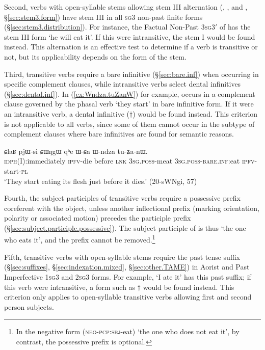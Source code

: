 Second, verbs with open-syllable stems allowing stem III alternation (, ,  and , §\ref{sec:stem3.form}) have stem III in all \textsc{sg}\fl{}3 non-past finite forms  (§\ref{sec:stem3.distribution}). For instance, the Factual Non-Past 3\textsc{sg}\fl{}3$'$ of  has the stem III form  `he will eat it'. If this were intransitive, the stem I  would be found instead. This alternation is an effective test to determine if a verb is transitive or not, but its applicability depends on the form of the stem.

Third, transitive verbs require a bare infinitive (§\ref{sec:bare.inf}) when occurring in specific complement clauses, while intransitive verbs select dental infinitives (§\ref{sec:dental.inf}). In (\ref{ex:Wndza.tuZanW}) for example,  occurs in a complement clause governed by the phasal verb  `they start' in bare infinitive form. If it were an intransitive verb, a dental infinitive ($\dagger$) would be found instead. This criterion is not applicable to all verbs, since some of them cannot occur in the subtype of complement clauses where bare infinitives are found for semantic reasons.

\begin{exe}
\ex   \label{ex:Wndza.tuZanW}
\gll  ɕlaʁ pjɯ-si ɕɯŋgɯ qʰe ɯ-ɕa ɯ-ndza tu-ʑa-nɯ. \\
\textsc{idph}(I):immediately \textsc{ipfv}-die before \textsc{lnk} \textsc{3sg}.\textsc{poss}-meat \textsc{3sg}.\textsc{poss}-\textsc{bare}.\textsc{inf}:eat \textsc{ipfv}-start-\textsc{pl} \\
\glt `They start eating its flesh just before it dies.' (20-sWNgi, 57)
\end{exe}

Fourth, the subject participles of transitive verbs require a possessive prefix coreferent with the object, unless another inflectional prefix (marking orientation, polarity or associated motion) precedes the participle prefix   (§\ref{sec:subject.participle.possessive}). The subject participle of  is thus  `the one who eats it', and the prefix  cannot be removed.\footnote{In the negative form  (\textsc{neg}-\textsc{pcp}:\textsc{sbj}-eat) `the one who does not eat it', by contrast, the possessive prefix  is optional.}

Fifth, transitive verbs with open-syllable stems require the past tense  suffix (§\ref{sec:suffixes}, §\ref{sec:indexation.mixed}, §\ref{sec:other.TAME}) in Aorist and Past Imperfective \textsc{1sg}\fl{}3 and \textsc{2sg}\fl{}3 forms. For example,  `I ate it' has this past suffix; if this verb were intransitive, a form such as $\dagger$ would be found instead. This criterion only applies to open-syllable transitive verbs allowing first and second person subjects.

